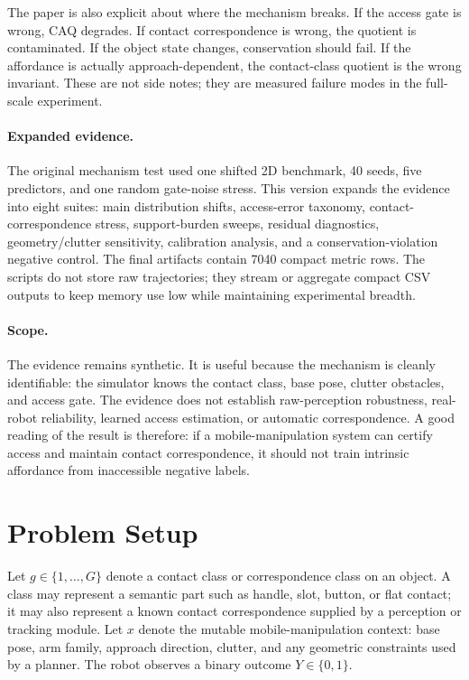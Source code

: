 \documentclass{article}
\newcommand{\ctx}{x}
\newcommand{\class}{g}
\begin{document}
The paper is also explicit about where the mechanism breaks. If the access gate is wrong, CAQ degrades. If contact correspondence is wrong, the quotient is contaminated. If the object state changes, conservation should fail. If the affordance is actually approach-dependent, the contact-class quotient is the wrong invariant. These are not side notes; they are measured failure modes in the full-scale experiment.

\paragraph{Expanded evidence.}
The original mechanism test used one shifted 2D benchmark, 40 seeds, five predictors, and one random gate-noise stress. This version expands the evidence into eight suites: main distribution shifts, access-error taxonomy, contact-correspondence stress, support-burden sweeps, residual diagnostics, geometry/clutter sensitivity, calibration analysis, and a conservation-violation negative control. The final artifacts contain 7040 compact metric rows. The scripts do not store raw trajectories; they stream or aggregate compact CSV outputs to keep memory use low while maintaining experimental breadth.

\paragraph{Scope.}
The evidence remains synthetic. It is useful because the mechanism is cleanly identifiable: the simulator knows the contact class, base pose, clutter obstacles, and access gate. The evidence does not establish raw-perception robustness, real-robot reliability, learned access estimation, or automatic correspondence. A good reading of the result is therefore: if a mobile-manipulation system can certify access and maintain contact correspondence, it should not train intrinsic affordance from inaccessible negative labels.

\section{Problem Setup}

Let $\class \in \{1,\ldots,G\}$ denote a contact class or correspondence class on an object. A class may represent a semantic part such as handle, slot, button, or flat contact; it may also represent a known contact correspondence supplied by a perception or tracking module. Let $\ctx$ denote the mutable mobile-manipulation context: base pose, arm family, approach direction, clutter, and any geometric constraints used by a planner. The robot observes a binary outcome $Y \in \{0,1\}$.
\end{document}
